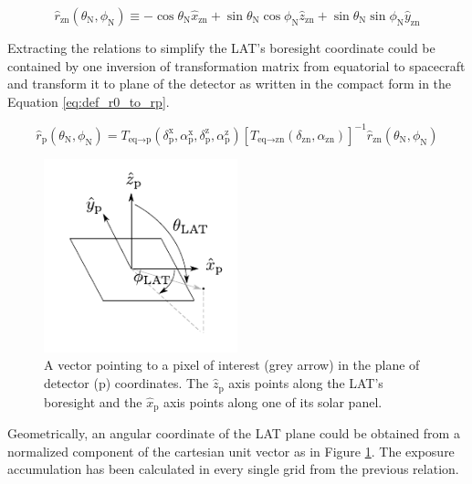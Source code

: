 \begin{equation}
    \hat{r}_\text{zn} (\theta_\text{N}, \phi_\text{N}) \equiv -\cos\theta_\text{N}\hat{x}_\text{zn} + \sin\theta_\text{N}\cos\phi_\text{N}\hat{z}_\text{zn} + \sin\theta_\text{N}\sin\phi_\text{N}\hat{y}_\text{zn}
    \label{eq:def_r0}
\end{equation}

Extracting the relations to simplify the 
LAT's boresight coordinate could be contained by one inversion of 
transformation matrix from equatorial to spacecraft and transform it 
to plane of the detector as written in the compact form in the Equation 
\ref{eq:def_r0_to_rp}.

\begin{equation}
    \hat{r}_\text{p} (\theta_\text{N}, \phi_\text{N}) = T_{\text{eq}\rightarrow\text{p}} (\delta^\text{x}_\text{p}, \alpha^\text{x}_\text{p}, \delta^\text{z}_\text{p}, \alpha^\text{z}_\text{p}) \left[T_{\text{eq}\rightarrow\text{zn}} (\delta_\text{zn}, \alpha_\text{zn})\right]^{-1} \hat{r}_\text{zn} (\theta_\text{N}, \phi_\text{N})
    \label{eq:def_r0_to_rp}
\end{equation}

\begin{figure}[h!]
    \centering
    \includegraphics[width=0.5\textwidth]{content/methodology/figures/fig_coordinate/coord_plane_v2.pdf}
    \caption{
        A vector pointing to a pixel of interest (grey arrow)
        in the plane of detector (p) coordinates.
        The $\hat{z}_\text{p}$ axis
        points along the LAT's boresight
        and the $\hat{x}_\text{p}$ axis
        points along one of its solar panel.
    }
    \label{fig:tf_lat_pol_car}
\end{figure}

Geometrically, an angular coordinate of the LAT plane could be obtained from
a normalized component of the cartesian unit vector as in Figure
\ref{fig:tf_lat_pol_car}. The exposure accumulation has been
calculated in every single grid from the previous relation.

